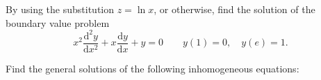 \documentclass[answers]{exam}
\newcommand*{\bump}{\vspace{1em}\phantom{}\vspace{-1.75em}}
\begin{document}
\begin{questions}
\begin{parts}
\part%
\bump \[
	\frac{\mathrm{d}^{2} y}{\mathrm{d} x^{2}}+4 y=0;
\]

\part%
\bump \[
	\frac{\mathrm d^2y}{\mathrm dx^2}+3\frac{\mathrm dy}{\mathrm dx}+2y=0;
\]

\part%
\bump \[
	\frac{\mathrm d^2y}{\mathrm dx^2}+2\frac{\mathrm dy}{\mathrm dx}+3y=0;
\]

\part%
\bump \[
	\frac{\mathrm d^3y}{\mathrm dx^3}+\frac{\mathrm d^2y}{\mathrm dx^2}+\frac{\mathrm dy}{\mathrm dx}+y=0;
\]

\part%
\bump \[
	\frac{\mathrm d^4y}{\mathrm dx^4}+\frac{\mathrm d^2y}{\mathrm dx^2}=0.
\]
\end{parts}



\question%
By using the substitution $z=\ln x$, or otherwise, find the solution of the boundary value problem \[
	x^2\frac{\mathrm d^2y}{\mathrm dx^2}+x\frac{\mathrm dy}{\mathrm dx}+y=0\qquad
	y(1)=0, \quad y(e)=1.
\]



\question%
Find the general solutions of the following inhomogeneous equations:
\begin{parts}
\part%
\bump \[
	\frac{\mathrm d^2y}{\mathrm dx^2}+3\frac{\mathrm dy}{\mathrm dx}+2y=4e^{3x}+2\sin x;
\]

\part%
\bump \[
	\frac{\mathrm d^2y}{\mathrm dx^2}+2\frac{\mathrm dy}{\mathrm dx}+3y=x^2+2.
\]
\end{parts}

\end{questions}
\end{document}
